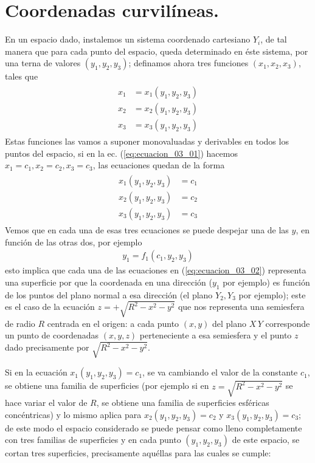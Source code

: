 \section{Coordenadas curvilíneas.}
En un espacio dado, instalemos un sistema coordenado cartesiano $Y_{i}$, de tal manera que para cada punto del espacio, queda determinado en éste sistema, por una terna de valores $(y_{1}, y_{2}, y_{3})$; definamos ahora tres funciones $(x_{1}, x_{2}, x_{3})$, tales que
\begin{align}
\begin{aligned}
x_{1} &= x_{1} (y_{1}, y_{2}, y_{3}) \\
x_{2} &= x_{2} (y_{1}, y_{2}, y_{3}) \\
x_{3} &= x_{3} (y_{1}, y_{2}, y_{3})
\end{aligned}
\label{eq:ecuacion_03_01}
\end{align}
Estas funciones las vamos a suponer monovaluadas y derivables en todos los puntos del espacio, si en la ec. (\ref{eq:ecuacion_03_01}) hacemos $x_{1} = c_{1}, x_{2} = c_{2}, x_{3} =c_{3}$, las ecuaciones quedan de la forma
\begin{align}
\begin{aligned}
x_{1} (y_{1}, y_{2}, y_{3}) &= c_{1} \\
x_{2} (y_{1}, y_{2}, y_{3}) &= c_{2} \\
x_{3} (y_{1}, y_{2}, y_{3}) &= c_{3}
\end{aligned}
\label{eq:ecuacion_03_02}
\end{align}
Vemos que en cada una de esas tres ecuaciones se puede despejar una de las $y$, en función de las otras dos, por ejemplo
\begin{align*}
y_{1} = f_{1} (c_{1}, y_{2}, y_{3})
\end{align*}
esto implica que cada una de las ecuaciones en (\ref{eq:ecuacion_03_02}) representa una superficie por que la coordenada en una dirección ($y_{1}$ por ejemplo) es función de los puntos del plano normal a esa dirección (el plano $Y_{2}, Y_{3}$ por ejemplo); este es el caso de la ecuación $z = +\sqrt{R^{2} - x^{2} - y^{2}}$ que nos representa una semiesfera de radio $R$ centrada en el origen: a cada punto $(x, y)$ del plano $X \, Y$ corresponde un punto de coordenadas $(x, y , z)$ perteneciente a esa semiesfera y el punto $z$ dado precisamente por $\sqrt{R^{2} - x^{2} - y^{2}}$.
\par
Si en la ecuación $x_{1} (y_{1}, y_{2}, y_{3}) = c_{1}$, se va cambiando el valor de la constante $c_{1}$, se obtiene una familia de superficies (por ejemplo si en $z = \sqrt{R^{2} - x^{2} - y^{2}}$ se hace variar el valor de $R$, se obtiene una familia de superficies esféricas concéntricas) y lo mismo aplica para $x_{2} (y_{1}, y_{2}, y_{3}) = c_{2}$ y $x_{3} (y_{1}, y_{2}, y_{3}) = c_{3}$; de este modo el espacio considerado se puede pensar como lleno completamente con tres familias de superficies y en cada punto $(y_{1}, y_{2}, y_{3})$ de este espacio, se cortan tres superficies, precisamente aquéllas para las cuales se cumple:
